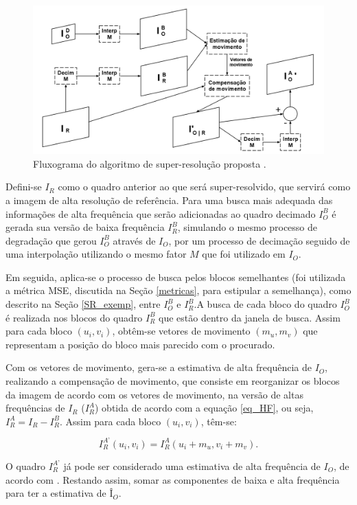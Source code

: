 \begin{figure}[h]
	\centering
	\includegraphics[scale=0.30]{figuras/fluxo_super_resolucao.png}
	\caption{Fluxograma do algoritmo de super-resolução proposta \cite{garcia2013tecnicas}.}
	\label{fig:algoritmo_proposto}
\end{figure}

Defini-se  $I_R$ como o quadro anterior ao que será super-resolvido, que servirá como a imagem de alta resolução de referência. Para uma busca mais adequada das informações de alta frequência que serão adicionadas ao quadro decimado $I_O^B$ é gerada sua versão de baixa frequência $I_R^B$, simulando o mesmo processo de degradação que gerou $I_O^B$ através de $I_O$,  por um processo de decimação seguido de uma interpolação utilizando o mesmo fator $M$ que foi utilizado em $I_O$.

     Em seguida, aplica-se o processo de busca pelos blocos semelhantes (foi utilizada a métrica MSE, discutida na Seção \ref{metricas}, para estipular a semelhança), como descrito na Seção \ref{SR_exemp}, entre $I_O^B$ e $I_R^B$.A busca de cada bloco do quadro $I_O^B$ é realizada nos blocos do quadro $I_R^B$ que estão dentro da janela de busca. Assim para cada bloco $(u_i,v_i)$, obtêm-se vetores de movimento $(m_u,m_v)$ que representam a posição do bloco mais parecido  com o procurado. 

Com os vetores de movimento, gera-se a estimativa de alta frequência de $I_O$, realizando a compensação de movimento, que consiste em reorganizar os blocos da imagem de acordo com os vetores de movimento, na versão de altas frequências de $I_R$ ($I_R^{A}$) obtida de acordo com a equação \ref{eq_HF}, ou seja, $I_R^{A} = I_R - I_R^B$. Assim para cada bloco $(u_i,v_i)$, têm-se:


\begin{equation}
I_R^{A’} (u_i,v_i) = I_R^A(u_i+m_u, v_i+m_v).
\end{equation}


O quadro $I_R^{A’} $ já pode ser considerado uma estimativa de alta frequência de $I_O$, de acordo com \cite{garcia2013tecnicas}. Restando assim, somar as componentes de baixa e alta frequência para ter a estimativa de $Î_O$.
